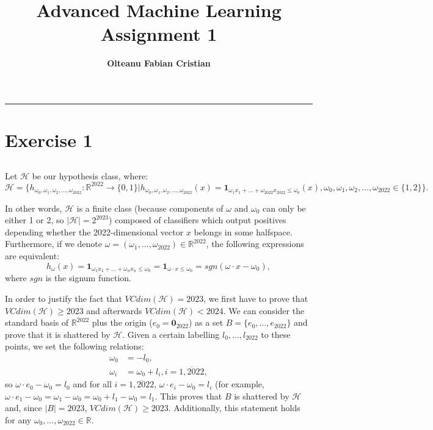 \documentclass{article}
\author{\textbf{Olteanu Fabian Cristian}}
\affil{FMI, AI Master, Year 1
}
\title{\textbf{\huge Advanced Machine Learning Assignment 1}}
\date{}
\begin{document}
\pagestyle{headings}	
\newpage
\setcounter{page}{1}
\renewcommand{\thepage}{\arabic{page}}


	
	
\setlength{\parskip}{0.5em}
	
\maketitle
	
\noindent\rule{15cm}{0.4pt}
\renewcommand{\thesubsection}{\thesection.\alph{subsection}}

\section{Exercise 1}
\subsection{}
Let $\mathcal{H}$ be our hypothesis class, where:
$
\mathcal{H}=\{h_{\omega_0, \omega_1,\omega_2,...,\omega_{2022}}:\mathbb{R}^{2022} \rightarrow \{0,1\}|h_{\omega_0, \omega_1,\omega_2,...,\omega_{2022}}(x) = \mathbf{1}_{\omega_1x_1 + ... + \omega_{2022}x_{2022} \leq \omega_0}(x), \omega_0,\omega_1,\omega_2,...,\omega_{2022}\in \{1,2\}\}.
$

In other words, $\mathcal{H}$ is a finite class (because components of $\omega$ and $\omega_0$ can only be either 1 or 2, so $|\mathcal{H}|=2^{2023}$) composed of classifiers which output positives depending whether the 2022-dimensional vector $x$ belongs in some halfspace. Furthermore, if we denote $\omega=(\omega_1,...,\omega_{2022})\in \mathbb{R}^{2022}$, the following expressions are equivalent: 
$$
h_\omega(x)=\mathbf{1}_{\omega_1x_1 + ... + \omega_nx_n \leq \omega_0}=\mathbf{1}_{\omega \cdot x \leq \omega_0}=sgn(\omega \cdot x - \omega_0),
$$ where $sgn$ is the signum function.

In order to justify the fact that $VCdim(\mathcal{H})=2023$, we first have to prove that $VCdim(\mathcal{H})\geq2023$ and afterwards $VCdim(\mathcal{H})<2024$. We can consider the standard basis of $\mathbb{R}^{2022}$ plus the origin ($e_0=\mathbf{0}_{2022}$) as a set $B=\{e_0,...,e_{2022}\}$ and prove that it is shattered by $\mathcal{H}$. Given a certain labelling $l_0,...,l_{2022}$ to these points, we set the following relations:
\begin{align*}
\omega_0 &= -l_0, \\
\omega_i &= \omega_0 + l_i, i=\overline{1,2022},
\end{align*}
so $\omega \cdot e_0 - \omega_0=l_0$ and for all $i=\overline{1,2022}$, $\omega \cdot e_i - \omega_0 = l_i$ (for example, $\omega \cdot e_1 - \omega_0 = \omega_1 - \omega_0 = \omega_0 + l_1 - \omega_0 = l_1$. This proves that $B$ is shattered by $\mathcal{H}$ and, since $|B|=2023$, $VCdim(\mathcal{H}) \geq 2023$. Additionally, this statement holds for any $\omega_0,...,\omega_{2022} \in \mathbb{R}$.
\end{document}
